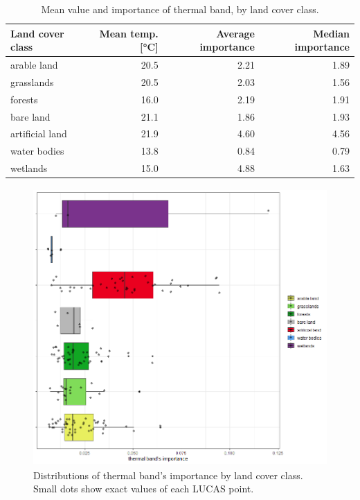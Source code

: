 \documentclass{amuthesis}
\begin{document}
\hypertarget{tbl-tabela6}{}
\begin{table}
\caption{\label{tbl-tabela6}Mean value and importance of thermal band, by land cover class. }\tabularnewline

\centering
\begin{tabular}{|>{}l|>{}r|>{}r|>{}r|}
\toprule
\textbf{Land cover class} & \textbf{Mean temp. [°C]} & \textbf{Average importance} & \textbf{Median importance}\\
\midrule
arable land & 20.5 & 2.21 & 1.89\\
\hline
grasslands & 20.5 & 2.03 & 1.56\\
\hline
forests & 16.0 & 2.19 & 1.91\\
\hline
bare land & 21.1 & 1.86 & 1.93\\
\hline
artificial land & 21.9 & 4.60 & 4.56\\
\hline
water bodies & 13.8 & 0.84 & 0.79\\
\hline
wetlands & 15.0 & 4.88 & 1.63\\
\bottomrule
\end{tabular}
\end{table}

\begin{figure}[t]

{\centering \includegraphics[width=4.45833in,height=4.16667in]{./figures/importance_classes.png}

}

\caption{\label{fig-rycina14}Distributions of thermal band's importance
by land cover class. Small dots show exact values of each LUCAS point.}

\end{figure}
\end{document}
